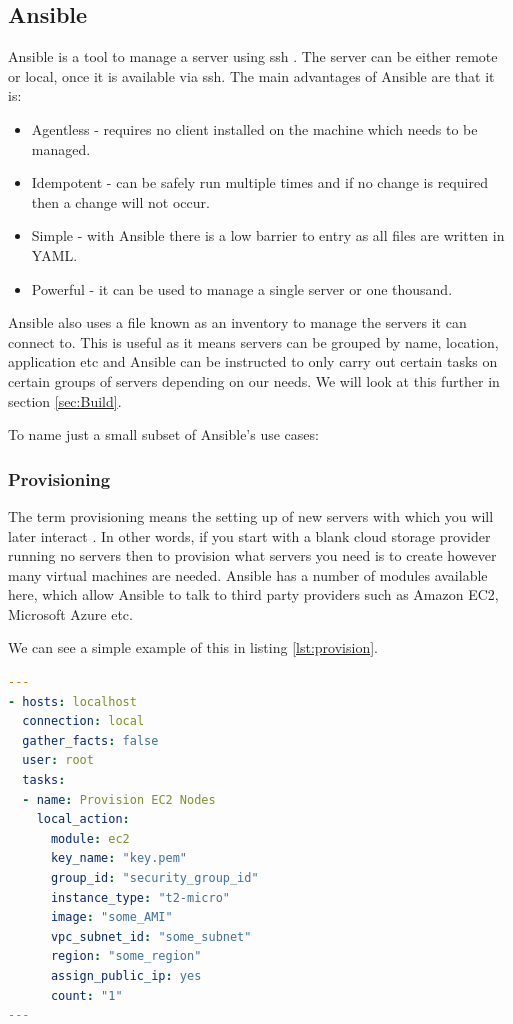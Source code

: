 \documentclass{article}
\begin{document}
\subsection{Ansible}
\label{sub:Ansible}
Ansible is a tool to manage a server using ssh \citep{Ansible2016}. The server can be either remote or local, once it is available via ssh. The main advantages of Ansible are that it is:

\begin{itemize}
  \item Agentless - requires no client installed on the machine which needs to be managed.
  \item Idempotent - can be safely run multiple times and if no change is required then a change will not occur.
  \item Simple - with Ansible there is a low barrier to entry as all files are written in YAML.
  \item Powerful - it can be used to manage a single server or one thousand. 
\end{itemize}

Ansible also uses a file known as an inventory to manage the servers it can connect to. This is useful as it means servers can be grouped by name, location, application etc and Ansible can be instructed to only carry out certain tasks on certain groups of servers depending on our needs. We will look at this further in section \ref{sec:Build}. 

To name just a small subset of Ansible's use cases:

\subsubsection{Provisioning}
The term provisioning means the setting up of new servers with which you will later interact \citep{Hochstein2015}. In other words, if you start with a blank cloud storage provider running no servers then to provision what servers you need is to create however many virtual machines are needed. Ansible has a number of modules available here, which allow Ansible to talk to third party providers such as Amazon EC2, Microsoft Azure etc. 

We can see a simple example of this in listing \ref{lst:provision}.

\begin{lstlisting}[float,floatplacement=H,language=yaml,caption={Playbook To Create Instances On EC2},label={lst:provision}]
---
- hosts: localhost
  connection: local
  gather_facts: false
  user: root
  tasks:
  - name: Provision EC2 Nodes
    local_action:
      module: ec2
      key_name: "key.pem"
      group_id: "security_group_id"
      instance_type: "t2-micro"
      image: "some_AMI"
      vpc_subnet_id: "some_subnet"
      region: "some_region"
      assign_public_ip: yes
      count: "1"
---
\end{lstlisting}
\end{document}
